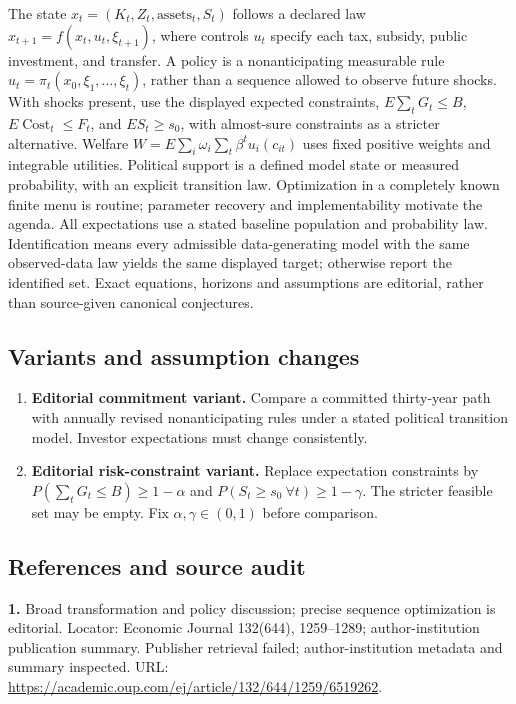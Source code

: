 \documentclass[11pt,a4paper]{article}
\begin{document}
The state \(x_t=(K_t,Z_t,\text{assets}_t,S_t)\) follows a declared law \(x_{t+1}=f(x_t,u_t,\xi_{t+1})\), where controls \(u_t\) specify each tax, subsidy, public investment, and transfer. A policy is a nonanticipating measurable rule \(u_t=\pi_t(x_0,\xi_1,\ldots,\xi_t)\), rather than a sequence allowed to observe future shocks. With shocks present, use the displayed expected constraints, \(E\sum_tG_t\leq B\), \(E\operatorname{Cost}_t\leq F_t\), and \(E S_t\geq s_0\), with almost-sure constraints as a stricter alternative. Welfare \(W=E\sum_i\omega_i\sum_t\beta^tu_i(c_{it})\) uses fixed positive weights and integrable utilities. Political support is a defined model state or measured probability, with an explicit transition law. Optimization in a completely known finite menu is routine; parameter recovery and implementability motivate the agenda. All expectations use a stated baseline population and probability law. Identification means every admissible data-generating model with the same observed-data law yields the same displayed target; otherwise report the identified set. Exact equations, horizons and assumptions are editorial, rather than source-given canonical conjectures.
\subsection*{Variants and assumption changes}
\begin{enumerate}
\item \textbf{Editorial commitment variant.} Compare a committed thirty-year path with annually revised nonanticipating rules under a stated political transition model. Investor expectations must change consistently.
\item \textbf{Editorial risk-constraint variant.} Replace expectation constraints by \(P(\sum_tG_t\leq B)\geq1-\alpha\) and \(P(S_t\geq s_0\ \forall t)\geq1-\gamma\). The stricter feasible set may be empty. Fix \(\alpha,\gamma\in(0,1)\) before comparison.
\end{enumerate}
\subsection*{References and source audit}
\textbf{1.} Broad transformation and policy discussion; precise sequence optimization is editorial. Locator: Economic Journal 132(644), 1259–1289; author-institution publication summary. Publisher retrieval failed; author-institution metadata and summary inspected. URL: \url{https://academic.oup.com/ej/article/132/644/1259/6519262}.
\end{document}

